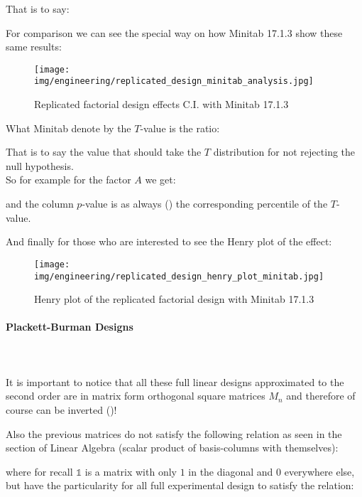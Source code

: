 	That is to say:
	
	For comparison we can see the special way on how Minitab 17.1.3 show these same results:
	\begin{figure}[H]
		\begin{center}
		\texttt{[image: img/engineering/replicated\_design\_minitab\_analysis.jpg]}
		\end{center}	
		\caption[]{Replicated factorial design effects C.I. with Minitab 17.1.3}
	\end{figure}
	\begin{tcolorbox}[title=Remark,colframe=black,arc=10pt]
	What Minitab denote by the $T$-value is the ratio:
	
	That is to say the value that should take the $T$ distribution for not rejecting the null hypothesis.\\
	
	So for example for the factor $A$ we get:
	
	and the column $p$-value is as always () the corresponding percentile of the $T$-value.
	\end{tcolorbox}
	And finally for those who are interested to see the Henry plot of the effect:
	\begin{figure}[H]
		\begin{center}
		\texttt{[image: img/engineering/replicated\_design\_henry\_plot\_minitab.jpg]}
		\end{center}	
		\caption{Henry plot of the replicated factorial design with Minitab 17.1.3}
	\end{figure}
	
	\pagebreak
	\paragraph{Plackett-Burman Designs}\mbox{}\\\\
	It is important to notice that all these full linear designs approximated to the second order are in matrix form orthogonal square matrices $M_{n}$ and therefore of course can be inverted ()!
	
	Also the previous matrices do not satisfy the following relation as seen in the section of Linear Algebra (scalar product of basis-columns with themselves):
	
	where for recall $\mathds{1}$ is a matrix with only $1$ in the diagonal and $0$ everywhere else, but have the particularity for all full experimental design to satisfy the relation:
	
